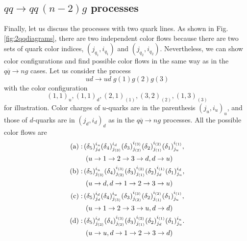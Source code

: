 \documentclass[a4paper,11pt]{article}
\begin{document}
\subsection{$qq\rightarrow qq\,(n-2)g$ processes}
Finally, let us discuss the processes with two quark lines. As shown in
Fig.\,\ref{fig:2qqdiagrams}, there are two independent color flows because there are two sets of quark color
indices, $(j_{q_1}, i_{q_1})$ and $(j_{q_2}, i_{q_2})$. Nevertheless, we
can show color configurations and find possible color flows in the same
way as in the $q\overline{q}\rightarrow ng$ cases. Let us consider the process
\begin{equation}
 u d\rightarrow u d \;g(1) g(2) g(3)
\end{equation}
with the color configuration
\begin{equation}
  (1,1)_u,(1,1)_d,(2,1)_{(1)},(3,2)_{(2)},(1,3)_{(3)}
\end{equation}
for illustration. Color charges of $u$-quarks are in the parenthesis
$(j_u,i_u)_u$, and those of $d$-quarks are in $(j_d,i_d)_d$ as in
the $q\overline{q}\rightarrow ng$ processes. All the possible color
flows are
\begin{subequations}
\begin{align}
 {\rm (a)}:\,&(\delta_5)^{i_u}_{j_d}(\delta_4)^{i_d}_{j_{(3)}}(\delta_3)^{i_{(3)}}_{j_{(2)}}(\delta_2)^{i_{(2)}}_{j_{(1)}}(\delta_1)^{i_{(1)}}_{j_u},\\
 &\;(u\rightarrow 1\rightarrow 2\rightarrow 3\rightarrow d, d\rightarrow u)\nonumber\\
 {\rm (b)}:\,&(\delta_5)^{i_u}_{j_{(3)}}(\delta_4)^{i_{(3)}}_{j_{(2)}}(\delta_3)^{i_{(2)}}_{j_{(1)}}(\delta_2)^{i_{(1)}}_{j_d}(\delta_1)^{i_d}_{j_u},\\
 &\;(u\rightarrow d, d\rightarrow 1\rightarrow 2\rightarrow
 3\rightarrow u)\nonumber\\
 {\rm (c)}:\,&(\delta_5)^{i_d}_{j_d}(\delta_4)^{i_u}_{j_{(3)}}(\delta_3)^{i_{(3)}}_{j_{(2)}}(\delta_2)^{i_{(2)}}_{j_{(1)}}(\delta_1)^{i_{(1)}}_{j_u},\\
 &\;(u\rightarrow 1\rightarrow 2\rightarrow 3\rightarrow u, d\rightarrow d)\nonumber\\
 {\rm (d)}:\,&(\delta_5)^{i_d}_{j_{(3)}}(\delta_4)^{i_{(3)}}_{j_{(2)}}(\delta_3)^{i_{(2)}}_{j_{(1)}}(\delta_2)^{i_{(1)}}_{j_d}(\delta_1)^{i_u}_{j_u}.\\
 &\;(u\rightarrow u, d\rightarrow 1\rightarrow 2\rightarrow
 3\rightarrow d)\nonumber
\end{align}
\end{subequations}
\end{document}

